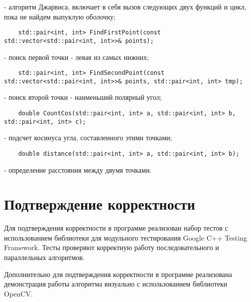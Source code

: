 \documentclass{report}
\begin{document}
- алгоритм Джарвиса, включает в себя вызов следующих двух функций и цикл, пока не найдем выпуклую оболочку;

\vspace{10pt}
\begin{lstlisting}
	std::pair<int, int> FindFirstPoint(const std::vector<std::pair<int, int>>& points);
\end{lstlisting}
\vspace{-25pt}

- поиск первой точки - левая из самых нижних;

\vspace{10pt}
\begin{lstlisting}
	std::pair<int, int> FindSecondPoint(const std::vector<std::pair<int, int>>& points, std::pair<int, int> tmp);
\end{lstlisting}
\vspace{-25pt}

- поиск второй точки - наименьший полярный угол;

\vspace{10pt}
\begin{lstlisting}
	double CountCos(std::pair<int, int> a, std::pair<int, int> b, std::pair<int, int> c);
\end{lstlisting}
\vspace{-25pt}

- подсчет косинуса угла, составленного этими точками;

\vspace{10pt}
\begin{lstlisting}
	double distance(std::pair<int, int> a, std::pair<int, int> b);
\end{lstlisting}
\vspace{-25pt}

- определение расстояния между двумя точками.

\newpage

\section{Подтверждение корректности}

Для подтверждения корректности в программе реализован набор тестов с использованием библиотеки для модульного тестирования Google C++ Testing Framework. Тесты проверяют корректную работу последовательного и параллельных алгоритмов.

\par Дополнительно для подтверждения корректности в программе реализована демонстрация работы алгоритма визуально с использованием библиотеки OpenCV.
\end{document}
